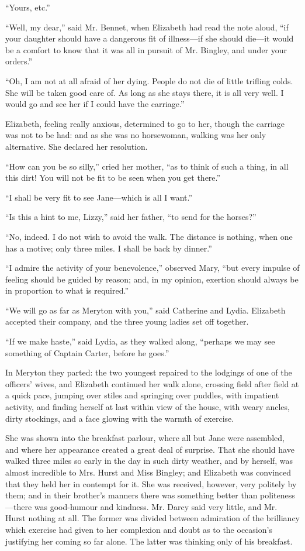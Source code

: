 ``Yours, etc.''

``Well, my dear,'' said Mr. Bennet, when Elizabeth had read the note aloud, ``if your daughter should have a dangerous fit of illness---if she should die---it would be a comfort to know that it was all in pursuit of Mr. Bingley, and under your orders.''

``Oh, I am not at all afraid of her dying. People do not die of little trifling colds. She will be taken good care of. As long as she stays there, it is all very well. I would go and see her if I could have the carriage.''

Elizabeth, feeling really anxious, determined to go to her, though the carriage was not to be had: and as she was no horsewoman, walking was her only alternative. She declared her resolution.

``How can you be so silly,'' cried her mother, ``as to think of such a thing, in all this dirt! You will not be fit to be seen when you get there.''

``I shall be very fit to see Jane---which is all I want.''

``Is this a hint to me, Lizzy,'' said her father, ``to send for the horses?''

``No, indeed. I do not wish to avoid the walk. The distance is nothing, when one has a motive; only three miles. I shall be back by dinner.''

``I admire the activity of your benevolence,'' observed Mary, ``but every impulse of feeling should be guided by reason; and, in my opinion, exertion should always be in proportion to what is required.''

``We will go as far as Meryton with you,'' said Catherine and Lydia. Elizabeth accepted their company, and the three young ladies set off together.

``If we make haste,'' said Lydia, as they walked along, ``perhaps we may see something of Captain Carter, before he goes.''

In Meryton they parted: the two youngest repaired to the lodgings of one of the officers' wives, and Elizabeth continued her walk alone, crossing field after field at a quick pace, jumping over stiles and springing over puddles, with impatient activity, and finding herself at last within view of the house, with weary ancles, dirty stockings, and a face glowing with the warmth of exercise.

She was shown into the breakfast parlour, where all but Jane were assembled, and where her appearance created a great deal of surprise. That she should have walked three miles so early in the day in such dirty weather, and by herself, was almost incredible to Mrs. Hurst and Miss Bingley; and Elizabeth was convinced that they held her in contempt for it. She was received, however, very politely by them; and in their brother's manners there was something better than politeness---there was good-humour and kindness. Mr. Darcy said very little, and Mr. Hurst nothing at all. The former was divided between admiration of the brilliancy which exercise had given to her complexion and doubt as to the occasion's justifying her coming so far alone. The latter was thinking only of his breakfast.

